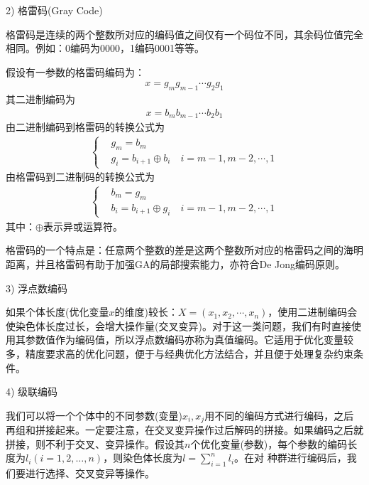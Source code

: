             \par
            2) 格雷码(Gray Code)
            \par
            格雷码是连续的两个整数所对应的编码值之间仅有一个码位不同，其余码位值完全相同。例如：0编码为0000，1编码0001等等。
            \par
            假设有一参数的格雷码编码为：
            \begin{align*}
            x=g_mg_{m-1}\cdots g_2g_1
            \end{align*}
            其二进制编码为
            \begin{align*}
            x=b_mb_{m-1}\cdots b_2b_1
            \end{align*}
            由二进制编码到格雷码的转换公式为
            \begin{align*}
            \left\{\begin{aligned}
            & g_m=b_{m}\\
            & g_i=b_{i+1}\oplus b_i\quad i=m-1,m-2,\cdots,1
            \end{aligned}
            \right.
            \end{align*}
            由格雷码到二进制码的转换公式为
            \begin{align*}
            \left\{\begin{aligned}
            & b_m=g_{m}\\
            & b_i=b_{i+1}\oplus g_i\quad i=m-1,m-2,\cdots,1
            \end{aligned}
            \right.
            \end{align*}
            其中：$\oplus$表示异或运算符。
            \par
            格雷码的一个特点是：任意两个整数的差是这两个整数所对应的格雷码之间的海明距离，并且格雷码有助于加强GA的局部搜索能力，亦符合De Jong编码原则。
            \par
            3) 浮点数编码
            \par
            如果个体长度(优化变量$x$的维度)较长：$X=(x_1,x_2,\cdots,x_n)$，使用二进制编码会使染色体长度过长，会增大操作量(交叉变异)。对于这一类问题，我们有时直接使用其参数值作为编码值，所以浮点数编码亦称为真值编码。它适用于优化变量较多，精度要求高的优化问题，便于与经典优化方法结合，并且便于处理复杂约束条件。
            \par
            4) 级联编码
            \par
            我们可以将一个个体中的不同参数(变量)$x_i,x_j$用不同的编码方式进行编码，之后再组和拼接起来。一定要注意，在交叉变异操作过后解码的拼接。如果编码之后就拼接，则不利于交叉、变异操作。假设其$n$个优化变量(参数)，每个参数的编码长度为$l_i(i=1,2,\ldots,n)$，则染色体长度为$l=\mathop{\sum}\limits_{i=1}^nl_i$。在对 种群进行编码后，我们要进行选择、交叉变异等操作。
